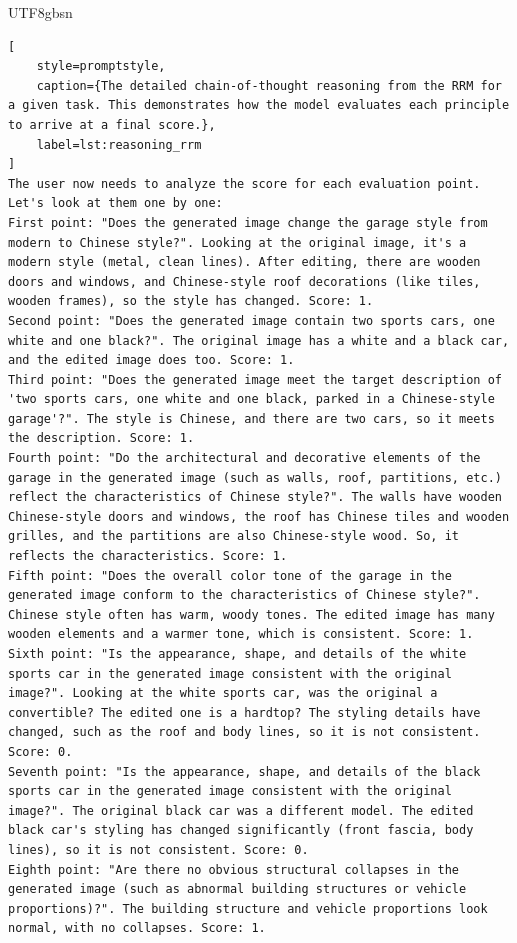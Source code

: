 \documentclass{llmxive}
\begin{document}
\begin{CJK*}{UTF8}{gbsn}
\begin{lstlisting}[
    style=promptstyle, 
    caption={The detailed chain-of-thought reasoning from the RRM for a given task. This demonstrates how the model evaluates each principle to arrive at a final score.}, 
    label=lst:reasoning_rrm
]
The user now needs to analyze the score for each evaluation point. Let's look at them one by one:
First point: "Does the generated image change the garage style from modern to Chinese style?". Looking at the original image, it's a modern style (metal, clean lines). After editing, there are wooden doors and windows, and Chinese-style roof decorations (like tiles, wooden frames), so the style has changed. Score: 1.
Second point: "Does the generated image contain two sports cars, one white and one black?". The original image has a white and a black car, and the edited image does too. Score: 1.
Third point: "Does the generated image meet the target description of 'two sports cars, one white and one black, parked in a Chinese-style garage'?". The style is Chinese, and there are two cars, so it meets the description. Score: 1.
Fourth point: "Do the architectural and decorative elements of the garage in the generated image (such as walls, roof, partitions, etc.) reflect the characteristics of Chinese style?". The walls have wooden Chinese-style doors and windows, the roof has Chinese tiles and wooden grilles, and the partitions are also Chinese-style wood. So, it reflects the characteristics. Score: 1.
Fifth point: "Does the overall color tone of the garage in the generated image conform to the characteristics of Chinese style?". Chinese style often has warm, woody tones. The edited image has many wooden elements and a warmer tone, which is consistent. Score: 1.
Sixth point: "Is the appearance, shape, and details of the white sports car in the generated image consistent with the original image?". Looking at the white sports car, was the original a convertible? The edited one is a hardtop? The styling details have changed, such as the roof and body lines, so it is not consistent. Score: 0.
Seventh point: "Is the appearance, shape, and details of the black sports car in the generated image consistent with the original image?". The original black car was a different model. The edited black car's styling has changed significantly (front fascia, body lines), so it is not consistent. Score: 0.
Eighth point: "Are there no obvious structural collapses in the generated image (such as abnormal building structures or vehicle proportions)?". The building structure and vehicle proportions look normal, with no collapses. Score: 1.

\end{lstlisting}
\end{CJK*}
\end{document}
